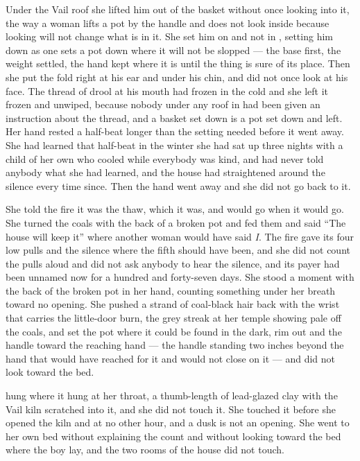 Under the Vail roof she lifted him out of the basket without once looking into it, the way a woman lifts a pot by the handle and does not look inside because looking will not change what is in it. She set him on  and not in , setting him down as one sets a pot down where it will not be slopped --- the base first, the weight settled, the hand kept where it is until the thing is sure of its place. Then she put the fold right at his ear and under his chin, and did not once look at his face. The thread of drool at his mouth had frozen in the cold and she left it frozen and unwiped, because nobody under any roof in  had been given an instruction about the thread, and a basket set down is a pot set down and left. Her hand rested a half-beat longer than the setting needed before it went away. She had learned that half-beat in the winter she had sat up three nights with a child of her own who cooled while everybody was kind, and had never told anybody what she had learned, and the house had straightened around the silence every time since. Then the hand went away and she did not go back to it.

She told the fire it was the thaw, which it was, and would go when it would go. She turned the coals with the back of a broken pot and fed them and said “The house will keep it” where another woman would have said \emph{I}. The fire gave its four low pulls and the silence where the fifth should have been, and she did not count the pulls aloud and did not ask anybody to hear the silence, and its payer had been unnamed now for a hundred and forty-seven days. She stood a moment with the back of the broken pot in her hand, counting something under her breath toward no opening. She pushed a strand of coal-black hair back with the wrist that carries the little-door burn, the grey streak at her temple showing pale off the coals, and set the pot where it could be found in the dark, rim out and the handle toward the reaching hand --- the handle standing two inches beyond the hand that would have reached for it and would not close on it --- and did not look toward the bed.

 hung where it hung at her throat, a thumb-length of lead-glazed clay with the Vail kiln scratched into it, and she did not touch it. She touched it before she opened the kiln and at no other hour, and a dusk is not an opening. She went to her own bed without explaining the count and without looking toward the bed where the boy lay, and the two rooms of the house did not touch.

